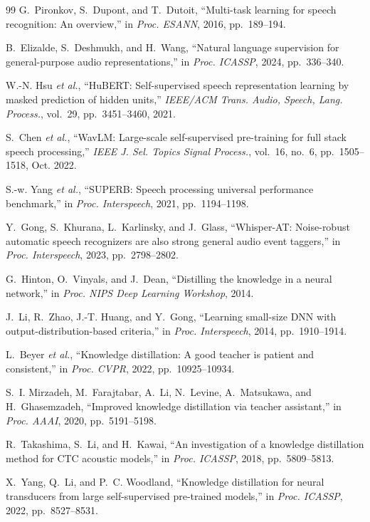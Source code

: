 \documentclass[lettersize,journal]{IEEEtran}
\begin{document}
\begin{thebibliography}{99}
G.~Pironkov, S.~Dupont, and T.~Dutoit, ``Multi-task learning for speech recognition: An overview,'' in \emph{Proc. ESANN}, 2016, pp.~189--194.

B.~Elizalde, S.~Deshmukh, and H.~Wang, ``Natural language supervision for general-purpose audio representations,'' in \emph{Proc. ICASSP}, 2024, pp.~336--340.

W.-N. Hsu \emph{et al.}, ``HuBERT: Self-supervised speech representation learning by masked prediction of hidden units,'' \emph{IEEE/ACM Trans. Audio, Speech, Lang. Process.}, vol.~29, pp.~3451--3460, 2021.

S.~Chen \emph{et al.}, ``WavLM: Large-scale self-supervised pre-training for full stack speech processing,'' \emph{IEEE J. Sel. Topics Signal Process.}, vol.~16, no.~6, pp.~1505--1518, Oct. 2022.

S.-w. Yang \emph{et al.}, ``SUPERB: Speech processing universal performance benchmark,'' in \emph{Proc. Interspeech}, 2021, pp.~1194--1198.

Y.~Gong, S.~Khurana, L.~Karlinsky, and J.~Glass, ``Whisper-AT: Noise-robust automatic speech recognizers are also strong general audio event taggers,'' in \emph{Proc. Interspeech}, 2023, pp.~2798--2802.

G.~Hinton, O.~Vinyals, and J.~Dean, ``Distilling the knowledge in a neural network,'' in \emph{Proc. NIPS Deep Learning Workshop}, 2014.

J.~Li, R.~Zhao, J.-T. Huang, and Y.~Gong, ``Learning small-size DNN with output-distribution-based criteria,'' in \emph{Proc. Interspeech}, 2014, pp.~1910--1914.

L.~Beyer \emph{et al.}, ``Knowledge distillation: A good teacher is patient and consistent,'' in \emph{Proc. CVPR}, 2022, pp.~10925--10934.

S.~I. Mirzadeh, M.~Farajtabar, A.~Li, N.~Levine, A.~Matsukawa, and H.~Ghasemzadeh, ``Improved knowledge distillation via teacher assistant,'' in \emph{Proc. AAAI}, 2020, pp.~5191--5198.

R.~Takashima, S.~Li, and H.~Kawai, ``An investigation of a knowledge distillation method for CTC acoustic models,'' in \emph{Proc. ICASSP}, 2018, pp.~5809--5813.

X.~Yang, Q.~Li, and P.~C. Woodland, ``Knowledge distillation for neural transducers from large self-supervised pre-trained models,'' in \emph{Proc. ICASSP}, 2022, pp.~8527--8531.


\end{thebibliography}
\end{document}
